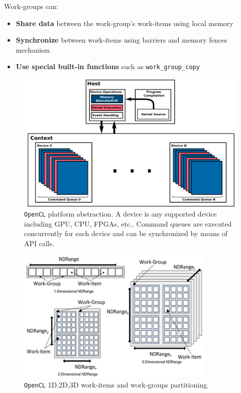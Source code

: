 \begin{description}
    Work-groups can:
    \begin{itemize}
		\item \textbf{Share data} between the work-group's work-items using local memory
		\item \textbf{Synchronize} between work-items using barriers and memory fences mechanism
		\item \textbf{Use special built-in functions} such as \texttt{work\_group\_copy}
    \end{itemize}

    \begin{figure}
	\centering
	\includegraphics[width=1.0\textwidth]{./images/parallel_programming/openCL}
	\caption[\texttt{OpenCL} platform abstraction.]{\texttt{OpenCL} platform abstraction. A device is any supported device including GPU, CPU, FPGAs, etc.. Command queues are executed concurrently for each device and can be synchronized by means of API calls.}
	\label{fig:openCL_platform}
\end{figure}

    \begin{figure}
	\centering
	\includegraphics[width=0.85\textwidth]{./images/parallel_programming/opencl_execmodel}
	\caption{\texttt{OpenCL} 1D,2D,3D work-items and work-groups partitioning. }
	\label{fig:opencl_execmodel}
\end{figure}


\end{description}
